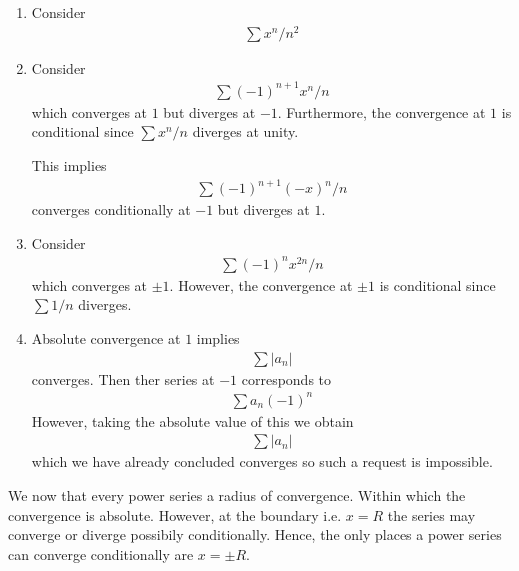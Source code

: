 \begin{enumerate}[label=(\alph*)]
    \item 
    Consider
    \begin{align*}
        \sum x^n/n^2
    \end{align*}

    \item
    Consider
    \begin{align*}
        \sum (-1)^{n+1} x^n/n
    \end{align*}
    which converges at $1$ but diverges at $-1$. Furthermore,
    the convergence at $1$ is conditional since $\sum x^n/n$ diverges at unity.
    
    This implies 
    \begin{align*}
        \sum (-1)^{n+1} (-x)^n/n
    \end{align*}
    converges conditionally at $-1$ but diverges at $1$.

    \item
    Consider
    \begin{align*}
        \sum (-1)^{n} x^{2n}/n
    \end{align*}
    which converges at $\pm 1$. However,
    the convergence at $\pm1$ is conditional since $\sum 1/n$ diverges.

    \item
    Absolute convergence at $1$ implies 
    \begin{align*}
        \sum |a_n|
    \end{align*}
    converges. Then ther series at $-1$ corresponds to 
    \begin{align*}
        \sum a_n (-1)^n
    \end{align*}
    However, taking the absolute value of this we obtain
    \begin{align*}
        \sum |a_n|
    \end{align*}
    which we have already concluded converges so such a request is 
    impossible.
\end{enumerate}

We now that every power series a radius of convergence. 
Within which the convergence is absolute. However, 
at the boundary i.e. $x=R$ the series may converge 
or diverge possibily conditionally. Hence, 
the only places a power series can converge conditionally 
are $x=\pm R$.

